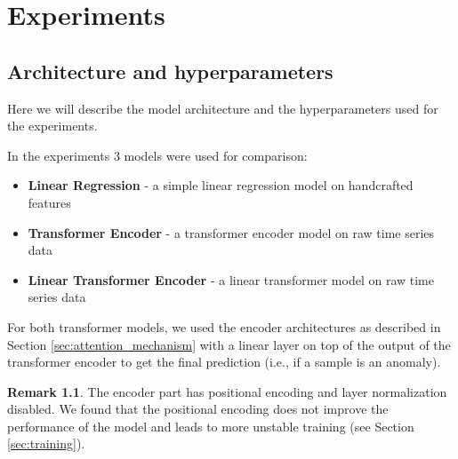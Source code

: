 \documentclass[a4paper, twoside]{report}
\theoremstyle{definition}
\newtheorem{remark}[theorem]{Remark}
\numberwithin{equation}{section}
\begin{document}









\chapter{Experiments}


\section{Architecture and hyperparameters}


Here we will describe the model architecture and the hyperparameters used for the experiments.

In the experiments 3 models were used for comparison:
\begin{itemize}
    \item \textbf{Linear Regression} - a simple linear regression model on handcrafted features
    \item \textbf{Transformer Encoder} - a transformer encoder model on raw time series data
    \item \textbf{Linear Transformer Encoder} - a linear transformer model on raw time series data
\end{itemize}

For both transformer models, we used the encoder architectures as described in Section \ref{sec:attention_mechanism}
with a linear layer on top of the output of the transformer encoder to get the final prediction (i.e., if a sample is an anomaly).
\begin{remark}
    The encoder part has positional encoding and layer normalization disabled.
    We found that the positional encoding does not improve the performance of the model and leads to more
    unstable training (see Section \ref{sec:training}).
\end{remark}
\end{document}
